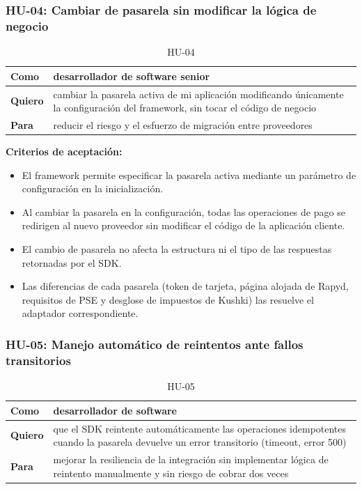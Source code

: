\subsubsection{HU-04: Cambiar de pasarela sin modificar la lógica de negocio}
\begin{table}[H]
  \centering
  \renewcommand{\arraystretch}{1.2}
  \begin{tabularx}{\textwidth}{|l|X|}
    \hline
    \textbf{Como} & desarrollador de software senior \\
    \hline
    \textbf{Quiero} & cambiar la pasarela activa de mi aplicación modificando únicamente la configuración del framework, sin tocar el código de negocio \\
    \hline
    \textbf{Para} & reducir el riesgo y el esfuerzo de migración entre proveedores \\
    \hline
  \end{tabularx}
  \caption{HU-04}
  \label{tab:hu-04}
\end{table}

\textbf{Criterios de aceptación:}
\begin{itemize}
  \item El framework permite especificar la pasarela activa mediante un parámetro de configuración en la inicialización.
  \item Al cambiar la pasarela en la configuración, todas las operaciones de pago se redirigen al nuevo proveedor sin modificar el código de la aplicación cliente.
  \item El cambio de pasarela no afecta la estructura ni el tipo de las respuestas retornadas por el SDK.
  \item Las diferencias de cada pasarela (token de tarjeta, página alojada de Rapyd, requisitos de PSE y desglose de impuestos de Kushki) las resuelve el adaptador correspondiente.
\end{itemize}

\subsubsection{HU-05: Manejo automático de reintentos ante fallos transitorios}
\begin{table}[H]
  \centering
  \renewcommand{\arraystretch}{1.2}
  \begin{tabularx}{\textwidth}{|l|X|}
    \hline
    \textbf{Como} & desarrollador de software \\
    \hline
    \textbf{Quiero} & que el SDK reintente automáticamente las operaciones idempotentes cuando la pasarela devuelve un error transitorio (timeout, error 500) \\
    \hline
    \textbf{Para} & mejorar la resiliencia de la integración sin implementar lógica de reintento manualmente y sin riesgo de cobrar dos veces \\
    \hline
  \end{tabularx}
  \caption{HU-05}
  \label{tab:hu-05}
\end{table}

